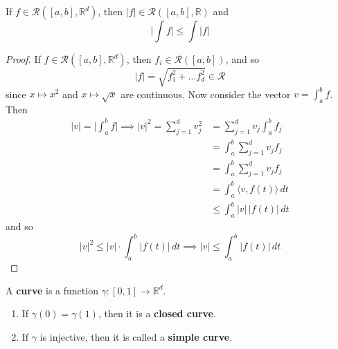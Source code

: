   \begin{theorem}
    \label{thm:triangle-inequality-for-vector-valued-integrals}
    If $f \in \mathcal{R}([a, b], \mathbb{R}^d)$, then $|f| \in \mathcal{R}([a, b], \mathbb{R})$ and 
    \begin{equation}
      \bigg| \int f \bigg| \leq \int |f|
    \end{equation}
  \end{theorem}
  \begin{proof}
    If $f \in \mathcal{R}([a, b], \mathbb{R}^d)$, then $f_i \in \mathcal{R}([a, b])$, and so 
    \begin{equation}
      |f| = \sqrt{f_1^2 + \ldots f_d^2} \in \mathcal{R}
    \end{equation}
    since $x \mapsto x^2$ and $x \mapsto \sqrt{x}$ are continuous. Now consider the vector $v = \int_a^b f$. Then 
    \begin{align}
      |v| = \bigg| \int_a^b f \bigg| \implies |v|^2 = \sum_{j=1}^d v_j^2 & = \sum_{j=1}^d v_j \int_a^b f_j \\ 
                                                                         & = \int_a^b \sum_{j=1}^d v_j f_j \\ 
                                                                         & = \int_a^b \sum_{j=1}^d v_j f_j \\
                                                                         & = \int_a^b \langle v, f(t) \rangle \,dt \\ 
                                                                         & \leq  \int_a^b |v|\, |f(t)| \,dt
    \end{align}
    and so 
    \begin{equation}
      |v|^2 \leq |v| \cdot \int_a^b |f(t)| \,dt \implies |v| \leq \int_a^b |f(t)| \,dt 
    \end{equation}
  \end{proof}

  \begin{definition}[Curve]
    \label{def:curve}
    A \textbf{curve} is a function $\gamma: [0, 1] \to \mathbb{R}^d$. 
    \begin{enumerate}
      \item If $\gamma(0) = \gamma(1)$, then it is a \textbf{closed curve}. 
      \item If $\gamma$ is injective, then it is called a \textbf{simple curve}. 
    \end{enumerate}
  \end{definition}


